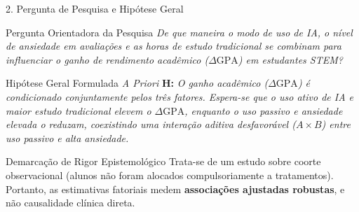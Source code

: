 \documentclass[aspectratio=169, 10pt]{beamer}
\begin{document}
\begin{frame}{2. Pergunta de Pesquisa e Hipótese Geral}
    \begin{block}{Pergunta Orientadora da Pesquisa}
        \textit{De que maneira o modo de uso de IA, o nível de ansiedade em avaliações e as horas de estudo tradicional se combinam para influenciar o ganho de rendimento acadêmico ($\Delta \text{GPA}$) em estudantes STEM?}
    \end{block}

    \vspace{4pt}

    \begin{exampleblock}{Hipótese Geral Formulada \textit{A Priori}}
        \textbf{H:} \textit{O ganho acadêmico ($\Delta \text{GPA}$) é condicionado conjuntamente pelos três fatores. Espera-se que o uso ativo de IA e maior estudo tradicional elevem o $\Delta \text{GPA}$, enquanto o uso passivo e ansiedade elevada o reduzam, coexistindo uma interação aditiva desfavorável ($A \times B$) entre uso passivo e alta ansiedade.}
    \end{exampleblock}

    \vspace{4pt}

    \begin{alertblock}{Demarcação de Rigor Epistemológico}
        Trata-se de um estudo sobre coorte observacional (alunos não foram alocados compulsoriamente a tratamentos). Portanto, as estimativas fatoriais medem \textbf{associações ajustadas robustas}, e não causalidade clínica direta.
    \end{alertblock}
\end{frame}
\end{document}
